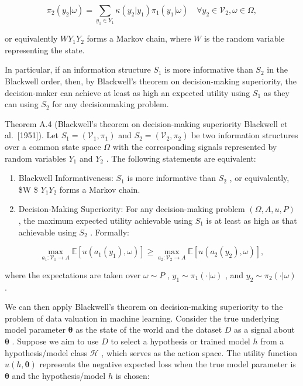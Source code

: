 \[
\pi _ { 2 } ( y _ { 2 } | \omega ) = \sum _ { y _ { 1 } \in Y _ { 1 } } \kappa ( y _ { 2 } | y _ { 1 } ) \pi _ { 1 } ( y _ { 1 } | \omega ) \quad \forall y _ { 2 } \in \mathcal { V } _ { 2 } , \omega \in \Omega ,
\]

or equivalently \(W  Y _ { 1 }  Y _ { 2 }\) forms a Markov chain, where
\(W\) is the random variable representing the state.

In particular, if an information structure \(S _ { 1 }\) is more
informative than \(S _ { 2 }\) in the Blackwell order, then, by
Blackwell's theorem on decision-making superiority, the decision-maker
can achieve at least as high an expected utility using \(S _ { 1 }\) as
they can using \(S _ { 2 }\) for any decisionmaking problem.

Theorem A.4 (Blackwell's theorem on decision-making superiority
Blackwell et al.~{[}1951{]}). Let
\(S _ { 1 } = ( \mathcal { V } _ { 1 } , \pi _ { 1 } )\) and
\(S _ { 2 } = ( \mathcal { V } _ { 2 } , \pi _ { 2 } )\) be two
information structures over a common state space \(\Omega\) with the
corresponding signals represented by random variables \(Y _ { 1 }\) and
\(Y _ { 2 }\) . The following statements are equivalent:

\begin{enumerate}
\def\labelenumi{\arabic{enumi}.}
\item
  Blackwell Informativeness: \(S _ { 1 }\) is more informative than
  \(S _ { 2 }\) , or equivalently, \$W \$ \(Y _ { 1 }  Y _ { 2 }\) forms
  a Markov chain.
\item
  Decision-Making Superiority: For any decision-making problem
  \(( \Omega , A , u , P )\) , the maximum expected utility achievable
  using \(S _ { 1 }\) is at least as high as that achievable using
  \(S _ { 2 }\) . Formally:
\end{enumerate}

\[
\operatorname* { m a x } _ { a _ { 1 } : \mathcal { V } _ { 1 } \to A } \mathbb { E } [ u ( a _ { 1 } ( y _ { 1 } ) , \omega ) ] \ge \operatorname* { m a x } _ { a _ { 2 } : \mathcal { V } _ { 2 } \to A } \mathbb { E } [ u ( a _ { 2 } ( y _ { 2 } ) , \omega ) ] ,
\]

where the expectations are taken over \(\omega \sim P\) ,
\(y _ { 1 } \sim \pi _ { 1 } ( \cdot | \omega )\) , and
\(y _ { 2 } \sim \pi _ { 2 } ( \cdot | \omega )\) .

We can then apply Blackwell's theorem on decision-making superiority to
the problem of data valuation in machine learning. Consider the true
underlying model parameter \(\pmb \theta\) as the state of the world and
the dataset \(D\) as a signal about \(\pmb \theta\) . Suppose we aim to
use \(D\) to select a hypothesis or trained model \(h\) from a
hypothesis/model class \(\mathcal { H }\) , which serves as the action
space. The utility function \(u ( h , \pmb \theta )\) represents the
negative expected loss when the true model parameter is \(\pmb \theta\)
and the hypothesis/model \(h\) is chosen:

